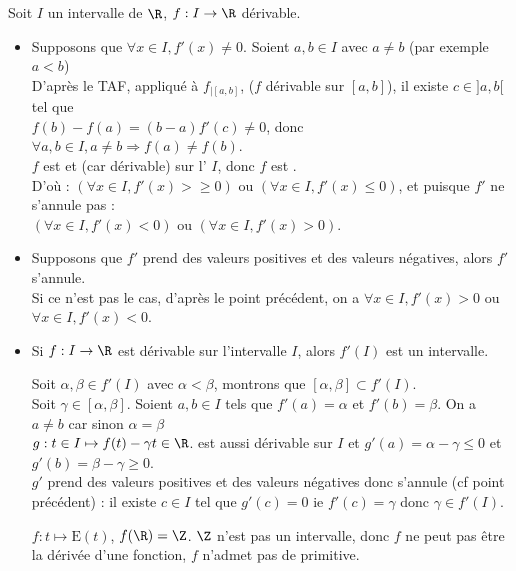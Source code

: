 \documentclass[12pt,a4paper]{report}
\begin{document}
\begin{remarque}
Soit $I$ un intervalle de $\R$, $f : I \to \R$ dérivable. \\
\begin{itemize}
	\item Supposons que $\forall x \in I, f'(x) \neq 0$. Soient $a,b \in I$ avec $a \neq b$ (par exemple $a < b$) \\
	D'après le TAF, appliqué à $f_{\lvert [a,b]}$, ($f$ dérivable sur $[a,b]$), il existe $c \in ]a,b[$ tel que \\
	$f(b)-f(a)=(b-a)f'(c) \neq 0$, donc $\forall a,b \in I, a \neq b \Longrightarrow f(a) \neq f(b)$. \\
	$f$ est  et  (car dérivable) sur l' $I$, donc $f$ est 	. \\
	D'où : $(\forall x \in I, f'(x) > \geq 0)$ ou $(\forall x \in I, f'(x) \leq 0)$, et puisque $f'$ ne s'annule pas : \\
	$(\forall x \in I, f'(x) < 0)$ ou $(\forall x \in I, f'(x) > 0)$. \\
	
	\item Supposons que $f'$ prend des valeurs positives et des valeurs négatives, alors $f'$ s'annule. \\
	Si ce n'est pas le cas, d'après le point précédent, on a $\forall x \in I, f'(x) > 0$ ou $\forall x \in I, f'(x) < 0$. \\
	
	\item Si $f : I \to \R$ est dérivable sur l'intervalle $I$, alors $f'(I)$ est un intervalle.
	
	\begin{demo}
	Soit $\alpha, \beta \in f'(I)$ avec $\alpha < \beta$, montrons que $[\alpha,\beta] \subset f'(I)$. \\
	Soit $\gamma \in [\alpha, \beta]$. Soient $a,b \in I$ tels que $f'(a) = \alpha$ et $f'(b) = \beta$. On a $a \neq b$ car sinon $\alpha = \beta$ \\
	$g : t \in I \mapsto f(t)-\gamma t \in \R$. est aussi dérivable sur $I$ et $g'(a) = \alpha-\gamma \leq 0$ et $g'(b)  = \beta - \gamma \geq 0$. \\
	$g'$ prend des valeurs positives et des valeurs négatives donc s'annule (cf point précédent) : il existe $c \in I$ tel que $g'(c) = 0$ ie $f'(c) = \gamma$ donc $\gamma \in f'(I)$.
	\end{demo}
	
	\begin{remarque}
	$f:t\mapsto \mathrm{E}(t)$, $f(\R) = \Z$. $\Z$ n'est pas un intervalle, donc $f$ ne peut pas être la dérivée d'une fonction, \ie $f$ n'admet pas de primitive.
	\end{remarque}
\end{itemize}

\end{remarque}
\end{document}
